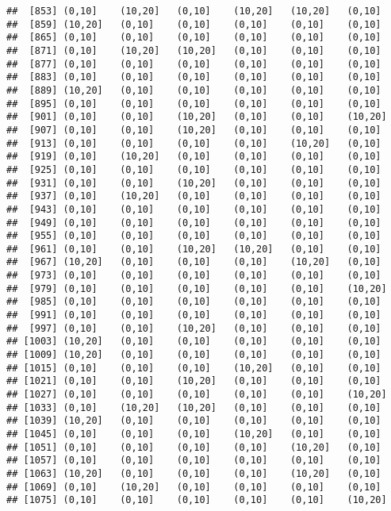 \documentclass[]{article}
\begin{document}
\begin{verbatim}
##  [853] (0,10]    (10,20]   (0,10]    (10,20]   (10,20]   (0,10]   
##  [859] (10,20]   (0,10]    (0,10]    (0,10]    (0,10]    (0,10]   
##  [865] (0,10]    (0,10]    (0,10]    (0,10]    (0,10]    (0,10]   
##  [871] (0,10]    (10,20]   (10,20]   (0,10]    (0,10]    (0,10]   
##  [877] (0,10]    (0,10]    (0,10]    (0,10]    (0,10]    (0,10]   
##  [883] (0,10]    (0,10]    (0,10]    (0,10]    (0,10]    (0,10]   
##  [889] (10,20]   (0,10]    (0,10]    (0,10]    (0,10]    (0,10]   
##  [895] (0,10]    (0,10]    (0,10]    (0,10]    (0,10]    (0,10]   
##  [901] (0,10]    (0,10]    (10,20]   (0,10]    (0,10]    (10,20]  
##  [907] (0,10]    (0,10]    (10,20]   (0,10]    (0,10]    (0,10]   
##  [913] (0,10]    (0,10]    (0,10]    (0,10]    (10,20]   (0,10]   
##  [919] (0,10]    (10,20]   (0,10]    (0,10]    (0,10]    (0,10]   
##  [925] (0,10]    (0,10]    (0,10]    (0,10]    (0,10]    (0,10]   
##  [931] (0,10]    (0,10]    (10,20]   (0,10]    (0,10]    (0,10]   
##  [937] (0,10]    (10,20]   (0,10]    (0,10]    (0,10]    (0,10]   
##  [943] (0,10]    (0,10]    (0,10]    (0,10]    (0,10]    (0,10]   
##  [949] (0,10]    (0,10]    (0,10]    (0,10]    (0,10]    (0,10]   
##  [955] (0,10]    (0,10]    (0,10]    (0,10]    (0,10]    (0,10]   
##  [961] (0,10]    (0,10]    (10,20]   (10,20]   (0,10]    (0,10]   
##  [967] (10,20]   (0,10]    (0,10]    (0,10]    (10,20]   (0,10]   
##  [973] (0,10]    (0,10]    (0,10]    (0,10]    (0,10]    (0,10]   
##  [979] (0,10]    (0,10]    (0,10]    (0,10]    (0,10]    (10,20]  
##  [985] (0,10]    (0,10]    (0,10]    (0,10]    (0,10]    (0,10]   
##  [991] (0,10]    (0,10]    (0,10]    (0,10]    (0,10]    (0,10]   
##  [997] (0,10]    (0,10]    (10,20]   (0,10]    (0,10]    (0,10]   
## [1003] (10,20]   (0,10]    (0,10]    (0,10]    (0,10]    (0,10]   
## [1009] (10,20]   (0,10]    (0,10]    (0,10]    (0,10]    (0,10]   
## [1015] (0,10]    (0,10]    (0,10]    (10,20]   (0,10]    (0,10]   
## [1021] (0,10]    (0,10]    (10,20]   (0,10]    (0,10]    (0,10]   
## [1027] (0,10]    (0,10]    (0,10]    (0,10]    (0,10]    (10,20]  
## [1033] (0,10]    (10,20]   (10,20]   (0,10]    (0,10]    (0,10]   
## [1039] (10,20]   (0,10]    (0,10]    (0,10]    (0,10]    (0,10]   
## [1045] (0,10]    (0,10]    (0,10]    (10,20]   (0,10]    (0,10]   
## [1051] (0,10]    (0,10]    (0,10]    (0,10]    (10,20]   (0,10]   
## [1057] (0,10]    (0,10]    (0,10]    (0,10]    (0,10]    (0,10]   
## [1063] (10,20]   (0,10]    (0,10]    (0,10]    (10,20]   (0,10]   
## [1069] (0,10]    (10,20]   (0,10]    (0,10]    (0,10]    (0,10]   
## [1075] (0,10]    (0,10]    (0,10]    (0,10]    (0,10]    (10,20]  

\end{verbatim}
\end{document}
